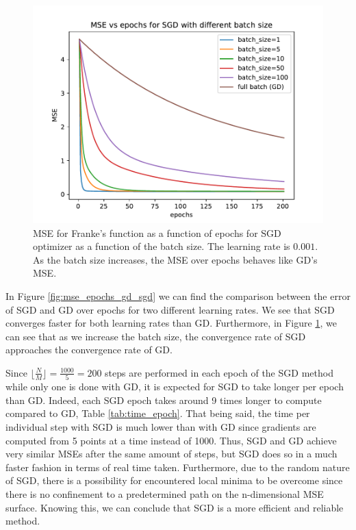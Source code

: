 \documentclass[aps,reprint,superscriptaddress,nofootinbib]{revtex4-2}
\begin{document}
\begin{figure}[htp]
    \centering
    \includegraphics[width=\linewidth]{part_a/2_mse_batch_size_epochs_200_eta_0.001.pdf}
    \caption{MSE for Franke's function as a function of epochs for SGD optimizer as a function of the batch size. The learning rate is \(0.001\). As the batch size increases, the MSE over epochs behaves like GD's MSE.}
    \label{fig:mse_epochs_bat_size}
\end{figure}

In Figure \ref{fig:mse_epochs_gd_sgd} we can find the comparison between the error of SGD and GD over epochs for two different learning rates. We see that SGD converges faster for both learning rates than GD. Furthermore, in Figure \ref{fig:mse_epochs_bat_size}, we can see that as we increase the batch size, the convergence rate of SGD approaches the convergence rate of GD.

Since \(\lfloor \frac{N}{M} \rfloor = \frac{1000}{5} = 200\) steps are performed in each epoch of the SGD method while only one is done with GD, it is expected for SGD to take longer per epoch than GD. Indeed, each SGD epoch takes around 9 times longer to compute compared to GD, Table \ref{tab:time_epoch}. That being said, the time per individual step with SGD is much lower than with GD since gradients are computed from 5 points at a time instead of 1000. Thus, SGD and GD achieve very similar MSEs after the same amount of steps, but SGD does so in a much faster fashion in terms of real time taken. Furthermore, due to the random nature of SGD, there is a possibility for encountered local minima to be overcome since there is no confinement to a predetermined path on the n-dimensional MSE surface. Knowing this, we can conclude that SGD is a more efficient and reliable method.
\end{document}
